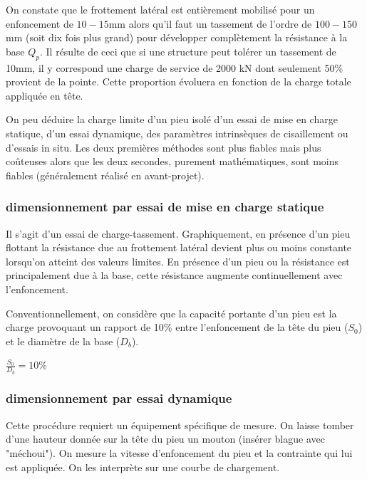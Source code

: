         On constate que le frottement latéral est entièrement mobilisé pour un enfoncement de $10-15$mm alors qu'il faut un tassement de l'ordre de $100-150$mm (soit dix fois plus grand) pour développer complètement la résistance à la base $Q_p$. Il résulte de ceci que si une structure peut tolérer un tassement de 10mm, il y correspond une charge de service de 2000 kN dont seulement 50\% provient de la pointe. Cette proportion évoluera en fonction de la charge totale appliquée en tête.
        
        On peu déduire la charge limite d'un pieu isolé d'un essai de mise en charge statique, d'un essai dynamique, des paramètres intrinsèques de cisaillement ou d'essais in situ. Les deux premières méthodes sont plus fiables mais plus coûteuses alors que les deux secondes, purement mathématiques, sont moins fiables (généralement réalisé en avant-projet).
        
        \subsubsection{dimensionnement par essai de mise en charge statique}
        
        Il s'agit d'un essai de charge-tassement. Graphiquement, en présence d'un pieu flottant la résistance due au frottement latéral devient plus ou moins constante lorsqu'on atteint des valeurs limites. En présence d'un pieu ou la résistance est principalement due à la base, cette résistance augmente continuellement avec l'enfoncement.
        
        Conventionnellement, on considère que la capacité portante d'un pieu est la charge provoquant un rapport de 10\% entre l'enfoncement de la tête du pieu ($S_0$) et le diamètre de la base ($D_b$). 
        
        \begin{center}
            $ \frac{S_0}{D_b} = 10\% $
        \end{center}
        
        \subsubsection{dimensionnement par essai dynamique}
        
        Cette procédure requiert un équipement spécifique de mesure. On laisse tomber d'une hauteur donnée sur la tête du pieu un mouton (insérer blague avec "méchoui"). On mesure la vitesse d'enfoncement du pieu et la contrainte qui lui est appliquée. On les interprète sur une courbe de chargement. 
        
